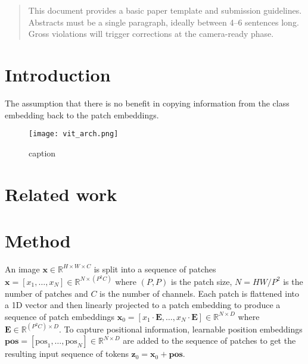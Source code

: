 \documentclass{article}
\theoremstyle{plain}
\theoremstyle{definition}
\theoremstyle{remark}
\begin{document}

\begin{abstract}
This document provides a basic paper template and submission guidelines.
Abstracts must be a single paragraph, ideally between 4--6 sentences long.
Gross violations will trigger corrections at the camera-ready phase.
\end{abstract}

\section{Introduction}
\label{introduction}

The assumption that there is no benefit in copying information from the class embedding back to the patch embeddings.


\begin{figure}[ht]
\vskip 0.2in
\begin{center}
\centerline{\texttt{[image: vit\_arch.png]}}
\caption{caption}
\label{vit_arch}
\end{center}
\vskip -0.2in
\end{figure}


\section{Related work}

\section{Method}

An image $\mathbf{x} \in \mathbb{R} ^ {H \times W \times C}$ is split into a sequence of patches $\mathbf{x} = [x_1, \ldots, x_N] \in \mathbb{R} ^ {N \times (P^2 C)}$ where $(P,P)$ is the patch size, $N = HW/P^2$ is the number of patches and $C$ is the number of channels.
Each patch is flattened into a 1D vector and then linearly projected to a patch embedding to produce a sequence of patch embeddings $\mathbf{x}_0 = [x_1 \cdot \mathbf{E}, \ldots, x_N \cdot \mathbf{E}] \in \mathbb{R}^{N \times D}$ where $\mathbf{E} \in \mathbb{R}^{(P^2C) \times D}$.
To capture positional information, learnable position embeddings $\mathbf{pos} = [\mathrm{pos}_1, \ldots, \mathrm{pos}_N] \in \mathbb{R}^{N \times D}$ are added to the sequence of patches to get the resulting input sequence of tokens $\mathbf{z}_0 = \mathbf{x}_0 + \mathbf{pos}$.
\end{document}
